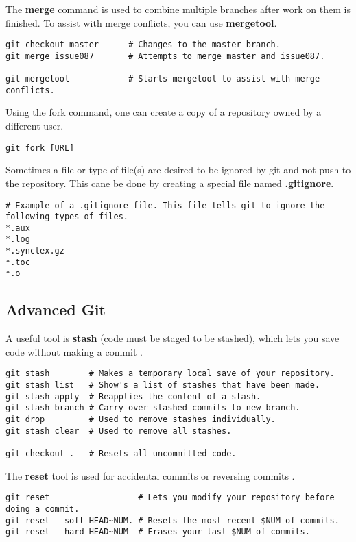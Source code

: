 The \textbf{merge} command is used to combine multiple branches after work on them is finished. To assist with merge conflicts, you can use \textbf{mergetool}.
\begin{lstlisting}
git checkout master      # Changes to the master branch.
git merge issue087       # Attempts to merge master and issue087.

git mergetool            # Starts mergetool to assist with merge conflicts.
\end{lstlisting}

Using the fork command, one can create a copy of a repository owned by a different user.
\begin{lstlisting}
git fork [URL]
\end{lstlisting}

Sometimes a file or type of file(s) are desired to be ignored by git and not push to the repository. This cane be done by creating a special file named \textbf{.gitignore}.
\begin{lstlisting}
# Example of a .gitignore file. This file tells git to ignore the following types of files.
*.aux
*.log
*.synctex.gz
*.toc
*.o
\end{lstlisting}








\subsection{Advanced Git}

A useful tool is \textbf{stash} (code must be staged to be stashed), which lets you save code without making a commit \cite{git}\cite{git: Advanced}.
\begin{lstlisting}
git stash        # Makes a temporary local save of your repository.
git stash list   # Show's a list of stashes that have been made.
git stash apply  # Reapplies the content of a stash.
git stash branch # Carry over stashed commits to new branch.
git drop         # Used to remove stashes individually.
git stash clear  # Used to remove all stashes.

git checkout .   # Resets all uncommitted code.
\end{lstlisting}

The \textbf{reset} tool is used for accidental commits or reversing commits \cite{git}\cite{git: Advanced}.
\begin{lstlisting}
git reset                  # Lets you modify your repository before doing a commit.
git reset --soft HEAD~NUM. # Resets the most recent $NUM of commits.
git reset --hard HEAD~NUM  # Erases your last $NUM of commits.
\end{lstlisting}

